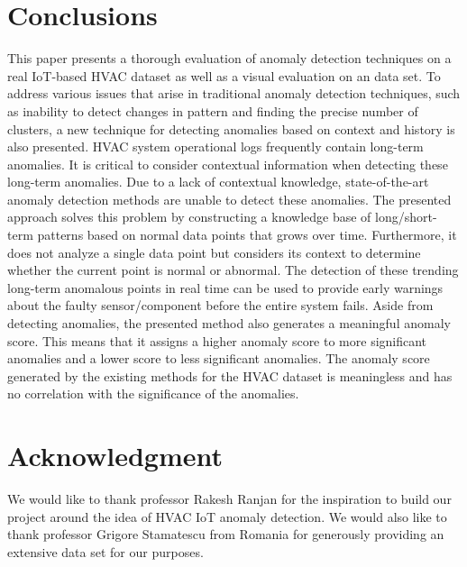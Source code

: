 \documentclass[conference]{IEEEtran}
\begin{document}
\section*{Conclusions}

This paper presents a thorough evaluation of anomaly detection techniques on a real IoT-based HVAC dataset as well as a visual evaluation on an data set. To address various issues that arise in traditional anomaly detection techniques, such as inability to detect changes in pattern and finding the precise number of clusters, a new technique for detecting anomalies based on context and history is also presented. HVAC system operational logs frequently contain long-term anomalies. It is critical to consider contextual information when detecting these long-term anomalies. Due to a lack of contextual knowledge, state-of-the-art anomaly detection methods are unable to detect these anomalies. The presented approach solves this problem by constructing a knowledge base of long/short-term patterns based on normal data points that grows over time. Furthermore, it does not analyze a single data point but considers its context to determine whether the current point is normal or abnormal. The detection of these trending long-term anomalous points in real time can be used to provide early warnings about the faulty sensor/component before the entire system fails. Aside from detecting anomalies, the presented method also generates a meaningful anomaly score. This means that it assigns a higher anomaly score to more significant anomalies and a lower score to less significant anomalies. The anomaly score generated by the existing methods for the HVAC dataset is meaningless and has no correlation with the significance of the anomalies.


\section*{Acknowledgment}
We would like to thank professor Rakesh Ranjan for the inspiration to build our project around the idea of HVAC IoT anomaly detection. We would also like to thank professor Grigore Stamatescu from Romania for generously providing an extensive data set for our purposes.
\end{document}
